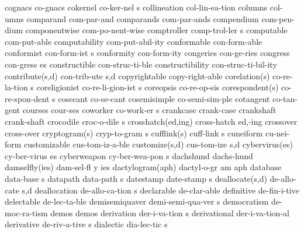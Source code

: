 \1 cognacs		co-gnacs
\5 cokernel		co-ker-nel s		%
\1 collineation 	col-lin-ea-tion		%
\1 columns              col-umns             %
\1 comparand		com-par-and
\1 comparands		com-par-ands
\1 compendium		com-pen-dium         %
\1 componentwise	com-po-nent-wise     %
\5 comptroller		comp-trol-ler s
\1 computable		com-put-able		%
\1 computability	com-put-abil-ity	%
\1 conformable		con-form-able
\5 conformist		con-form-ist s
\1 conformity		con-form-ity
\NewWordtrue
\1 congeries		con-ge-ries		%
\5 congress		con-gress es
\1 constructible	con-struc-ti-ble	%
\1 constructibility	con-struc-ti-bil-ity	%
\2 contribute(s,d)	con-trib-ute s,d
\1 copyrightable	copy-right-able		%
\2 corelation(s)	co-re-la-tion s		%
\5 coreligionist	co-re-li-gion-ist s	%
\1 coreopsis		co-re-op-sis		%
\2 corespondent(s)	co-re-spon-dent s	%
\1 cosecant		co-se-cant
\NewWordtrue
\1 cosemisimple		co-semi-sim-ple		%
\1 cotangent		co-tan-gent
\1 courses		cour-ses
\5 coworker		co-work-er s		%
\1 crankcase		crank-case		%
\1 crankshaft		crank-shaft
\5 crocodile		croc-o-dile s
\2 crosshatch(ed,ing)	cross-hatch ed,-ing
\1 crossover		cross-over		%
\2 cryptogram(s)	cryp-to-gram s		%
\2 cufflink(s)		cuff-link s		%
\1 cuneiform		cu-nei-form		%
\1 customizable		cus-tom-iz-a-ble	%
\2 customize(s,d)	cus-tom-ize s,d		%
\NewWordtrue
\2 cybervirus(es)	cy-ber-virus es		%
\NewWordtrue
\5 cyberweapon		cy-ber-wea-pon s	%
\1 dachshund		dachs-hund
\3 damselfly(ies)	dam-sel-fl y ies	%
\3 dactylogram(aph)	dactyl-o-gr am aph	%
\5 database		data-base s
\5 datapath		data-path s
\5 datestamp		date-stamp s            %
\2 deallocate(s,d)	de-allo-cate s,d	%
\5 deallocation		de-allo-ca-tion s	%
\1 declarable		de-clar-able
\1 definitive		de-fin-i-tive
\1 delectable		de-lec-ta-ble
\5 demisemiquaver	demi-semi-qua-ver s	%
\1 democratism		de-moc-ra-tism
\1 demos		demos	
\5 derivation		der-i-va-tion s		%
\1 derivational		der-i-va-tion-al	%
\5 derivative		de-riv-a-tive s
\5 dialectic		dia-lec-tic s		%

